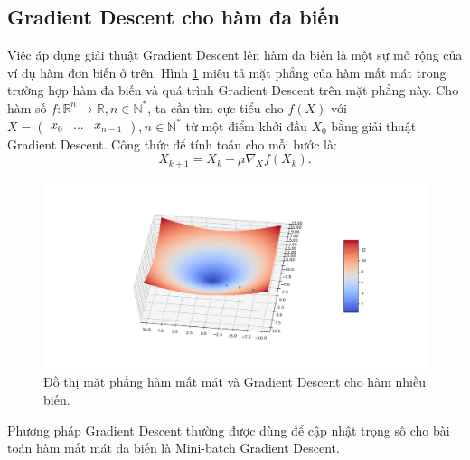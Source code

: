 \subsection{Gradient Descent cho hàm đa biến}
Việc áp dụng giải thuật Gradient Descent lên hàm đa biến là một sự mở rộng của ví dụ hàm đơn biến ở trên. Hình \ref{fig:3dgradient_descent} miêu tả mặt phẳng của hàm mất mát trong trường hợp hàm đa biến và quá trình Gradient Descent trên mặt phẳng này. Cho hàm số $f:{{\mathbb{R}}^n}{\rightarrow}{\mathbb{R}}, n{\in}{\mathbb{N}}^*$, ta cần tìm cực tiểu cho $f(X)$ với $X=\begin{pmatrix}x_0 & ... & x_{n-1}\end{pmatrix}, n{\in}{\mathbb{N}}^*$ từ một điểm khởi đầu $X_0$ bằng giải thuật Gradient Descent. Công thức để tính toán cho mỗi bước là:
\begin{equation}
	X_{k+1}=X_{k}-{\mu}{{\nabla}_X}f\left(X_{k}\right).
\end{equation}
\begin{figure}[ht!]
	\centerline{\includegraphics[scale=0.5]{images/3dgradient_descent.png}}
  	\caption{Đồ thị mặt phẳng hàm mất mát và Gradient Descent cho hàm nhiều biến.}
  	\label{fig:3dgradient_descent}
\end{figure}
Phương pháp Gradient Descent thường được dùng để cập nhật trọng số cho bài toán hàm mất mát đa biến là Mini-batch Gradient Descent.
